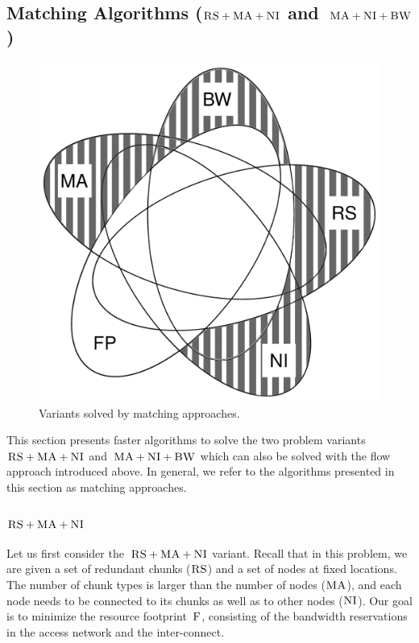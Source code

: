 \subsection{Matching Algorithms ($\textsc{RS}+\textsc{MA}+\textsc{NI}$ and~$\textsc{MA}+\textsc{NI}+\textsc{BW}$)}\label{ssec:match}


\begin{figure}[t]
\centering
\includegraphics[width=0.49\columnwidth]{figs/static-mapping/venn_matching.pdf}
\caption{Variants solved by matching approaches.}
\vspace{-1em}
\label{fig:venn_match}
\end{figure}
This section presents faster algorithms to solve 
the two problem variants
$\textsc{RS}+\textsc{MA}+\textsc{NI}$ and~$\textsc{MA}+\textsc{NI}+\textsc{BW}$ which can also be solved with the flow approach
introduced above.
In general, we refer to the algorithms presented in this section
as matching approaches.


\subsubsection{$\textsc{RS}+\textsc{MA}+\textsc{NI}$}

Let us first consider the~$\textsc{RS}+\textsc{MA}+\textsc{NI}$ variant.
Recall that in this problem,
we are given a set of redundant chunks ($\textsc{RS}$) and a set of nodes
at fixed locations. The number of chunk types is larger than the number
of nodes ($\textsc{MA}$), and each node needs to be connected
to its chunks as well as to other nodes ($\textsc{NI}$).
Our goal is to minimize the resource footprint~$\textsc{F}$, consisting
of the bandwidth reservations in the access network and the inter-connect.

